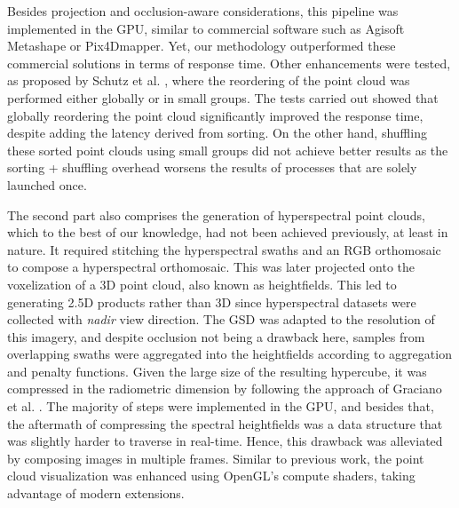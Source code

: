 Besides projection and occlusion-aware considerations, this pipeline was implemented in the GPU, similar to commercial software such as Agisoft Metashape or Pix4Dmapper. Yet, our methodology outperformed these commercial solutions in terms of response time. Other enhancements were tested, as proposed by Schutz et al. \cite{schutz_rendering_2021}, where the reordering of the point cloud was performed either globally or in small groups. The tests carried out showed that globally reordering the point cloud significantly improved the response time, despite adding the latency derived from sorting. On the other hand, shuffling these sorted point clouds using small groups did not achieve better results as the sorting + shuffling overhead worsens the results of processes that are solely launched once.  

The second part also comprises the generation of hyperspectral point clouds, which to the best of our knowledge, had not been achieved previously, at least in nature. It required stitching the hyperspectral swaths and an RGB orthomosaic to compose a hyperspectral orthomosaic. This was later projected onto the voxelization of a 3D point cloud, also known as heightfields. This led to generating 2.5D products rather than 3D since hyperspectral datasets were collected with \textit{nadir} view direction. The GSD was adapted to the resolution of this imagery, and despite occlusion not being a drawback here, samples from overlapping swaths were aggregated into the heightfields according to aggregation and penalty functions. Given the large size of the resulting hypercube, it was compressed in the radiometric dimension by following the approach of Graciano et al. \cite{graciano_real-time_2018}. The majority of steps were implemented in the GPU, and besides that, the aftermath of compressing the spectral heightfields was a data structure that was slightly harder to traverse in real-time. Hence, this drawback was alleviated by composing images in multiple frames. Similar to previous work, the point cloud visualization was enhanced using OpenGL's compute shaders, taking advantage of modern extensions.


